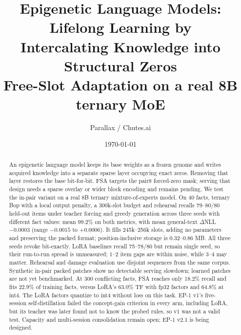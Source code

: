 \documentclass[11pt]{article}
\title{\vspace{-2em}\textbf{Epigenetic Language Models: Lifelong Learning by\\ Intercalating Knowledge into Structural Zeros}\\[0.3em]\large Free-Slot Adaptation on a real 8B ternary MoE}
\author{Parallax / Chutes.ai}
\date{\today}
\begin{document}
\maketitle
\vspace{-1.5em}
\small

\begin{center}
\end{center}

\begin{abstract}
An epigenetic language model keeps its base weights as a frozen genome and writes acquired knowledge
into a separate sparse layer occupying exact zeros. Removing that layer restores the base bit-for-bit.
FSA targets the pair8 forced-zero mask; serving that design needs a sparse overlay or wider block encoding and remains pending. We test the in-pair variant on a real 8B ternary mixture-of-experts model. On 40 facts,
ternary Bop with a local output penalty, a 300k-slot budget and rehearsal recalls 79--80/80 held-out
items under teacher forcing and greedy generation across three seeds with different fact values: mean 99.2\% on both metrics,
with mean general-text $\Delta$NLL $-0.0003$ (range $-0.0015$ to $+0.0006$). It fills 245k--256k
slots, adding no parameters and preserving the packed format; position-inclusive storage is
0.32--0.86 MB. All three seeds revoke bit-exactly. LoRA baselines recall 75--78/80 but remain single
seed, so their run-to-run spread is unmeasured; 1--2 item gaps are within noise, while 3--4 may matter. Rehearsal and damage evaluation use disjoint
sequences from the same corpus. Synthetic in-pair packed patches show no detectable serving slowdown;
learned patches are not yet benchmarked. At 300 conflicting facts, FSA reaches only 18.2\% recall
and fits 22.9\% of training facts, versus LoRA's 63.0\% TF with fp32 factors and 64.8\% at int4.
The LoRA factors quantize to int4 without loss on this task. EP-1 v1's five-session self-distillation failed the concept-gain criterion in every
arm, including LoRA, but its teacher was later found not to know the probed rules, so v1 was not a valid test.
Capacity and multi-session consolidation remain open; EP-1 v2.1 is being designed.
\end{abstract}
\end{document}
